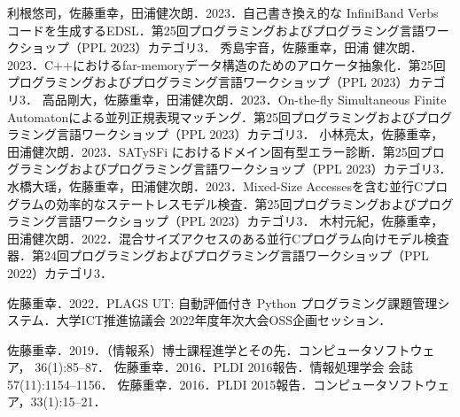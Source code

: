 \documentclass[dvipdfmx]{jsarticle}
\begin{document}
\begin{thebibliography}{100}
  利根悠司，佐藤重幸，田浦健次朗．2023．自己書き換え的な InfiniBand Verbs コードを生成するEDSL．第25回プログラミングおよびプログラミング言語ワークショップ（PPL 2023）カテゴリ3．
  秀島宇音，佐藤重幸，田浦 健次朗．2023．C++におけるfar-memoryデータ構造のためのアロケータ抽象化．第25回プログラミングおよびプログラミング言語ワークショップ（PPL 2023）カテゴリ3．
  高品剛大，佐藤重幸，田浦健次朗．2023．On-the-fly Simultaneous Finite Automatonによる並列正規表現マッチング．第25回プログラミングおよびプログラミング言語ワークショップ（PPL 2023）カテゴリ3．
  小林亮太，佐藤重幸，田浦健次朗．2023．SATySFi におけるドメイン固有型エラー診断．第25回プログラミングおよびプログラミング言語ワークショップ（PPL 2023）カテゴリ3．
  水橋大瑶，佐藤重幸，田浦健次朗．2023．Mixed-Size Accessesを含む並行Cプログラムの効率的なステートレスモデル検査．第25回プログラミングおよびプログラミング言語ワークショップ（PPL 2023）カテゴリ3．
  木村元紀，佐藤重幸，田浦健次朗．2022．混合サイズアクセスのある並行Cプログラム向けモデル検査器．第24回プログラミングおよびプログラミング言語ワークショップ（PPL 2022）カテゴリ3．

  佐藤重幸．2022．PLAGS UT: 自動評価付き Python プログラミング課題管理システム．大学ICT推進協議会 2022年度年次大会OSS企画セッション．

  佐藤重幸．2019．（情報系）博士課程進学とその先．コンピュータソフトウェア， 36(1):85–87．
  佐藤重幸．2016．PLDI 2016報告．情報処理学会 会誌 57(11):1154–1156．
  佐藤重幸．2016．PLDI 2015報告．コンピュータソフトウェア，33(1):15–21．

\end{thebibliography}
\end{document}
